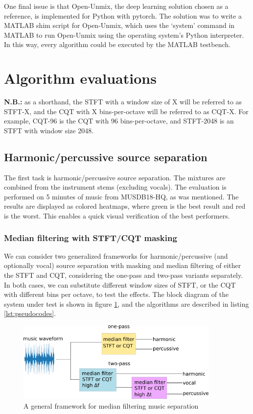 \documentclass[letter,12pt]{article}
\begin{document}
One final issue is that Open-Unmix, the deep learning solution chosen as a reference, is implemented for Python with pytorch\cite{pytorch}. The solution was to write a MATLAB shim script for Open-Unmix, which uses the `system' command in MATLAB to run Open-Unmix using the operating system's Python interpreter. In this way, every algorithm could be executed by the MATLAB testbench.

\section{Algorithm evaluations}
\label{sec:elim}

\textbf{N.B.:} as a shorthand, the STFT with a window size of X will be referred to as STFT-X, and the CQT with X bins-per-octave will be referred to as CQT-X. For example, CQT-96 is the CQT with 96 bins-per-octave, and STFT-2048 is an STFT with window size 2048.

\subsection{Harmonic/percussive source separation}

The first task is harmonic/percussive source separation. The mixtures are combined from the instrument stems (excluding vocals). The evaluation is performed on 5 minutes of music from MUSDB18-HQ, as was mentioned. The results are displayed as colored heatmaps, where green is the best result and red is the worst. This enables a quick visual verification of the best performers.

\subsubsection{Median filtering with STFT/CQT masking}
\label{subsec:mfilthpss}

We can consider two generalized frameworks for harmonic/percussive (and optionally vocal) source separation with masking and median filtering of either the STFT and CQT, considering the one-pass and two-pass variants separately. In both cases, we can substitute different window sizes of STFT, or the CQT with different bins per octave, to test the effects. The block diagram of the system under test is shown in figure \ref{fig:fitz2}, and the algorithms are described in listing \ref{lst:pseudocodes}.

\begin{figure}[ht]
	\centering
	\includegraphics[width=10cm]{./medianfiltdiagram.png}
	\caption{A general framework for median filtering music separation}
	\label{fig:fitz2}
\end{figure}
\end{document}
